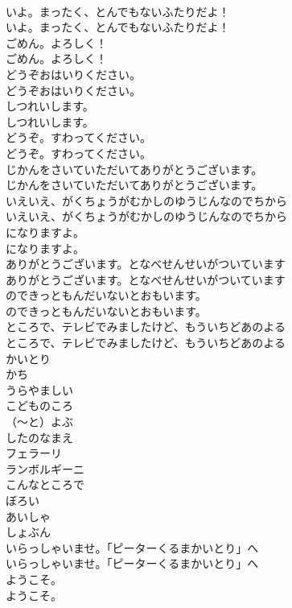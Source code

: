\documentclass[8pt]{extreport}
\begin{document}
\begin{CJK}{UTF8}{min}
\\	いよ。まったく、とんでもないふたりだよ！
\\	いよ。まったく、とんでもないふたりだよ！
\\	ごめん。よろしく！
\\	ごめん。よろしく！
\\	どうぞおはいりください。
\\	どうぞおはいりください。
\\	しつれいします。
\\	しつれいします。
\\	どうぞ。すわってください。
\\	どうぞ。すわってください。
\\	じかんをさいていただいてありがとうございます。
\\	じかんをさいていただいてありがとうございます。
\\	いえいえ、がくちょうがむかしのゆうじんなのでちから
\\	いえいえ、がくちょうがむかしのゆうじんなのでちから
\\	になりますよ。
\\	になりますよ。
\\	ありがとうございます。となべせんせいがついています
\\	ありがとうございます。となべせんせいがついています
\\	のできっともんだいないとおもいます。
\\	のできっともんだいないとおもいます。
\\	ところで、テレビでみましたけど、もういちどあのよる
\\	ところで、テレビでみましたけど、もういちどあのよる
\\	かいとり
\\	かち
\\	うらやましい
\\	こどものころ
\\	（～と）よぶ
\\	したのなまえ
\\	フェラーリ
\\	ランボルギーニ
\\	こんなところで
\\	ぼろい
\\	あいしゃ
\\	しょぶん
\\	いらっしゃいませ。「ピーターくるまかいとり」へ
\\	いらっしゃいませ。「ピーターくるまかいとり」へ
\\	ようこそ。
\\	ようこそ。

\end{CJK}
\end{document}
